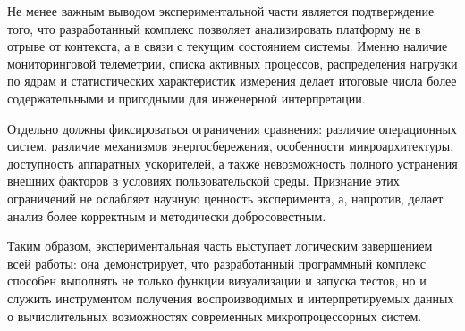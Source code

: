 Не менее важным выводом экспериментальной части является подтверждение того, что разработанный комплекс позволяет анализировать платформу не в отрыве от контекста, а в связи с текущим состоянием системы. Именно наличие мониторинговой телеметрии, списка активных процессов, распределения нагрузки по ядрам и статистических характеристик измерения делает итоговые числа более содержательными и пригодными для инженерной интерпретации.

Отдельно должны фиксироваться ограничения сравнения: различие операционных систем, различие механизмов энергосбережения, особенности микроархитектуры, доступность аппаратных ускорителей, а также невозможность полного устранения внешних факторов в условиях пользовательской среды. Признание этих ограничений не ослабляет научную ценность эксперимента, а, напротив, делает анализ более корректным и методически добросовестным.

Таким образом, экспериментальная часть выступает логическим завершением всей работы: она демонстрирует, что разработанный программный комплекс способен выполнять не только функции визуализации и запуска тестов, но и служить инструментом получения воспроизводимых и интерпретируемых данных о вычислительных возможностях современных микропроцессорных систем.
